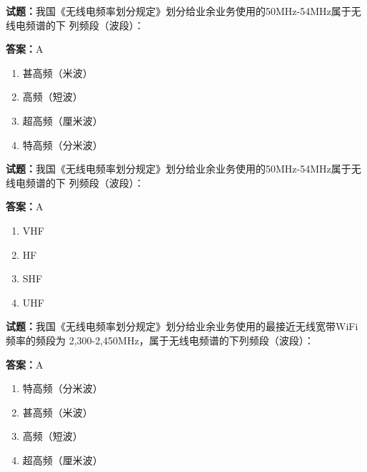 \documentclass{ctexbook}
\begin{document}




\vspace{1em}

\textbf{试题：}我国《无线电频率划分规定》划分给业余业务使用的50MHz-54MHz属于无线电频谱的下
列频段（波段）： 

\textbf{答案：}A 

\begin{enumerate}[leftmargin=3em]
  \item 甚高频（米波） 

  \item 高频（短波） 

  \item 超高频（厘米波） 

  \item 特高频（分米波） 

\end{enumerate}





\vspace{1em}

\textbf{试题：}我国《无线电频率划分规定》划分给业余业务使用的50MHz-54MHz属于无线电频谱的下
列频段（波段）： 

\textbf{答案：}A 

\begin{enumerate}[leftmargin=3em]
  \item VHF 

  \item HF 

  \item SHF 

  \item UHF 

\end{enumerate}






\vspace{1em}

\textbf{试题：}我国《无线电频率划分规定》划分给业余业务使用的最接近无线宽带WiFi频率的频段为
2,300-2,450MHz，属于无线电频谱的下列频段（波段）： 

\textbf{答案：}A 

\begin{enumerate}[leftmargin=3em]
  \item 特高频（分米波） 

  \item 甚高频（米波） 

  \item 高频（短波） 

  \item 超高频（厘米波） 

\end{enumerate}
\end{document}
